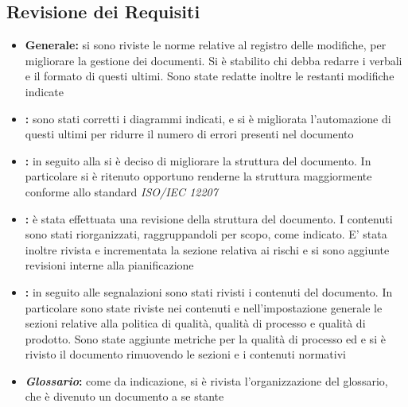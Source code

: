 \documentclass[12pt,a4paper]{article}
\begin{document}
\subsection{Revisione dei Requisiti}
\begin{itemize}
	\item \textbf{Generale:} si sono riviste le norme relative al registro delle modifiche, per migliorare la gestione dei documenti. Si è stabilito chi debba redarre i verbali e il formato di questi ultimi. Sono state redatte inoltre le restanti modifiche indicate
	\item \textbf{\AdR{}:} sono stati corretti i diagrammi indicati, e si è migliorata l'automazione di questi ultimi per ridurre il numero di errori presenti nel documento
	\item \textbf{\NdP{}:} in seguito alla \RR{} si è deciso di migliorare la struttura del documento. In particolare si è ritenuto opportuno renderne la struttura maggiormente conforme allo standard \textit{ISO/IEC 12207}
	\item \textbf{\PdP{}:} è stata effettuata una revisione della struttura del documento. I contenuti sono stati riorganizzati, raggruppandoli per scopo, come indicato. E' stata inoltre rivista e incrementata la sezione relativa ai rischi e si sono aggiunte revisioni interne alla pianificazione
	\item \textbf{\PdQ{}:} in seguito alle segnalazioni sono stati rivisti i contenuti del documento. In particolare sono state riviste nei contenuti e nell'impostazione generale le sezioni relative alla politica di qualità, qualità di processo e qualità di prodotto. Sono state aggiunte metriche per la qualità di processo ed e si è rivisto il documento rimuovendo le sezioni e i contenuti normativi
	\item \textbf{\textit{Glossario}:} come da indicazione, si è rivista l'organizzazione del glossario, che è divenuto un documento a se stante
\end{itemize}
\end{document}
